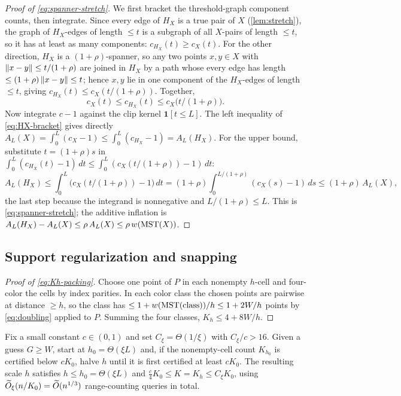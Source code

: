\begin{proof}[Proof of \eqref{eq:spanner-stretch}]
We first bracket the threshold-graph component counts, then integrate. Since every edge of $H_X$ is a true
pair of $X$ (\cref{lem:stretch}), the graph of $H_X$-edges of length $\le t$ is a subgraph of all $X$-pairs
of length $\le t$, so it has at least as many components: $c_{H_X}(t)\ge c_X(t)$. For the other direction,
$H_X$ is a $(1+\rho)$-spanner, so any two points $x,y\in X$ with $\left\lVert x-y \right\rVert\le t/(1+\rho)$ are joined in
$H_X$ by a path whose every edge has length $\le(1+\rho)\left\lVert x-y \right\rVert\le t$; hence $x,y$ lie in one component
of the $H_X$-edges of length $\le t$, giving $c_{H_X}(t)\le c_X(t/(1+\rho))$. Together,
\begin{equation}\label{eq:HX-bracket}
  c_X(t)\le c_{H_X}(t)\le c_X\!\bigl(t/(1+\rho)\bigr).
\end{equation}
Now integrate $c-1$ against the clip kernel $\mathbf 1[t\le L]$. The left inequality of \eqref{eq:HX-bracket}
gives directly $A_L(X)=\int_0^L(c_X-1)\le\int_0^L(c_{H_X}-1)=A_L(H_X)$. For the upper bound, substitute
$t=(1+\rho)s$ in $\int_0^L(c_{H_X}(t)-1)\,dt\le\int_0^L(c_X(t/(1+\rho))-1)\,dt$:
\[
  A_L(H_X)\le\int_0^{L}\!\bigl(c_X(t/(1+\rho))-1\bigr)\,dt=(1+\rho)\!\int_0^{L/(1+\rho)}\!\!(c_X(s)-1)\,ds
   \le(1+\rho)\,A_L(X),
\]
the last step because the integrand is nonnegative and $L/(1+\rho)\le L$. This is \eqref{eq:spanner-stretch};
the additive inflation is $A_L(H_X)-A_L(X)\le\rho\,A_L(X)\le\rho\,w(\mathrm{MST}(X))$.
\end{proof}

\subsection{Support regularization and snapping}\label{sec:app-snap}

\begin{proof}[Proof of \eqref{eq:Kh-packing}]
Choose one point of $P$ in each nonempty $h$-cell and four-color the cells by index parities. In each
color class the chosen points are pairwise at distance $\ge h$, so the class has $\le 1+w(\mathrm{MST}(\text{class}))/h
\le 1+2W/h$ points by \eqref{eq:doubling} applied to $P$. Summing the four classes,
$K_h\le 4+8W/h$.
\end{proof}

\begin{lemma}\label{lem:kwindow}
Fix a small constant $c\in(0,1)$ and set $C_\xi=\Theta(1/\xi)$ with $C_\xi/c>16$. Given a guess $G\ge W$,
start at $h_0=\Theta(\xi L)$ and, if the nonempty-cell count $K_{h_0}$ is certified below $cK_0$, halve $h$
until it is first certified at least $cK_0$. The resulting scale $h$ satisfies $h\le h_0=\Theta(\xi L)$ and
$\tfrac{c}{4}K_0\le K=K_h\le C_\xi K_0$, using $\widetilde{O}_\xi(n/K_0)=\widetilde{O}(n^{1/3})$ range-counting queries in
total.
\end{lemma}

